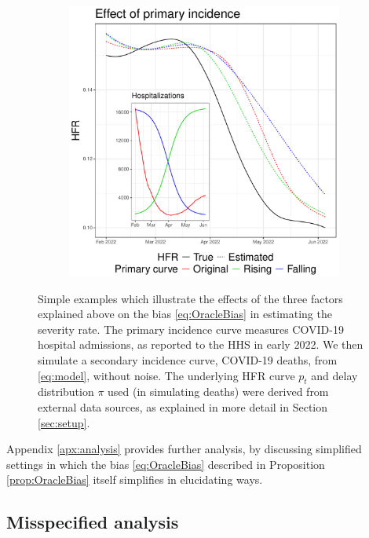 \documentclass{article}
\begin{document}
\begin{figure}[htb]
\begin{subfigure}[b]{0.325\linewidth}
  \caption{}
  \label{fig:toy_delay}
\end{subfigure}
\begin{subfigure}[b]{0.325\linewidth}
  \centering
  \includegraphics[width=\linewidth]{Figures/Simulated/toy_chging_primary.pdf} 
  \caption{}
  \label{fig:toy_primary}
\end{subfigure}
\caption{Simple examples which illustrate the effects of the three factors
  explained above on the bias \eqref{eq:OracleBias} in estimating the severity
  rate. The primary incidence curve measures COVID-19 hospital admissions, as
  reported to the HHS in early 2022. We then simulate a secondary incidence
  curve, COVID-19 deaths, from \eqref{eq:model}, without noise. The underlying  
  HFR curve $p_t$ and delay distribution $\pi$ used (in simulating deaths) were 
  derived from external data sources, as explained in more detail in Section
  \ref{sec:setup}.}      
\label{fig:wellspecified}
\end{figure}
      
Appendix \ref{apx:analysis} provides further analysis, by discussing 
simplified settings in which the bias \eqref{eq:OracleBias} described in
Proposition \ref{prop:OracleBias} itself simplifies in elucidating ways.   

\subsection{Misspecified analysis}
\label{sec:misspecified}
\end{document}
